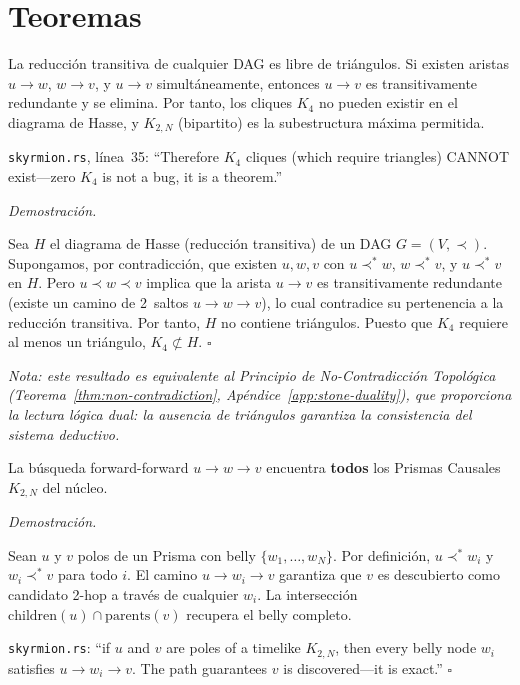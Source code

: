 \documentclass[11pt, a4paper, openany]{book}
\newcommand{\covers}{\prec^{\!*}}
\renewenvironment{proof}[1][Demostraci\'on]{%
  \par\noindent\textit{#1.}\quad
}{\hfill$\square$\par\medskip}
\begin{document}
\section{Teoremas}

\begin{theorem}
\label{thm:app-triangle-free}
La reducci\'on transitiva de cualquier DAG es libre de
tri\'angulos. Si existen aristas $u \to w$, $w \to v$, y $u \to v$
simult\'aneamente, entonces $u \to v$ es transitivamente redundante
y se elimina. Por tanto, los cliques $K_4$ no pueden existir
en el diagrama de Hasse, y $K_{2,N}$ (bipartito) es la subestructura
m\'axima permitida.

\medskip\noindent
\texttt{skyrmion.rs}, l\'inea~35: ``Therefore $K_4$ cliques
(which require triangles) CANNOT exist---zero $K_4$ is not a bug,
it is a theorem.''
\end{theorem}

\begin{proof}
Sea $H$ el diagrama de Hasse (reducci\'on transitiva) de un DAG
$G = (V, \prec)$. Supongamos, por contradicci\'on, que existen
$u, w, v$ con $u \covers w$, $w \covers v$, y
$u \covers v$ en $H$. Pero $u \prec w \prec v$ implica que
la arista $u \to v$ es transitivamente redundante (existe un
camino de 2~saltos $u \to w \to v$), lo cual contradice su
pertenencia a la reducci\'on transitiva. Por tanto, $H$ no
contiene tri\'angulos. Puesto que $K_4$ requiere al menos un
tri\'angulo, $K_4 \not\subset H$.
\end{proof}

\smallskip\noindent
{\small\itshape Nota: este resultado es equivalente al Principio de
No-Contradicci\'on Topol\'ogica
(Teorema~\ref{thm:non-contradiction},
Ap\'endice~\ref{app:stone-duality}), que proporciona la lectura
l\'ogica dual: la ausencia de tri\'angulos garantiza la consistencia
del sistema deductivo.}

\begin{theorem}
\label{thm:app-2hop}
La b\'usqueda forward-forward $u \to w \to v$ encuentra
\textbf{todos} los Prismas Causales $K_{2,N}$ del n\'ucleo.
\end{theorem}

\begin{proof}
Sean $u$ y $v$ polos de un Prisma con belly
$\{w_1,\ldots,w_N\}$. Por definici\'on, $u \covers w_i$ y
$w_i \covers v$ para todo $i$. El camino
$u \to w_i \to v$ garantiza que $v$ es descubierto como candidato
2-hop a trav\'es de cualquier $w_i$. La intersecci\'on
$\text{children}(u) \cap \text{parents}(v)$ recupera el belly
completo.

\medskip\noindent
\texttt{skyrmion.rs}: ``if $u$ and $v$ are poles of a timelike
$K_{2,N}$, then every belly node $w_i$ satisfies
$u \to w_i \to v$. The path guarantees $v$ is discovered---it is
exact.''
\end{proof}
\end{document}
